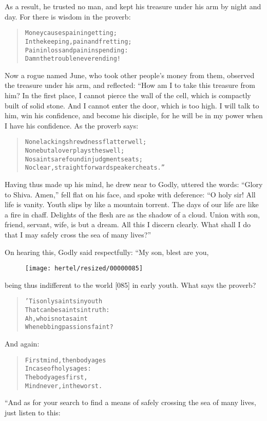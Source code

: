 \documentclass[article, twoside, 10pt]{memoir}
\renewenvironment{verbatim}{%
\begin{quote}%
\vskip -10pt%
\begin{alltt}\normalfont\small}{\end{alltt}%
\end{quote}%
\vskip -10pt
} %
\begin{document}
As a result, he trusted no man, and kept his treasure under his arm
by night and day. For there is wisdom in the proverb:

\begin{verbatim}
Money causes pain in getting;
In the keeping, pain and fretting;
Pain in loss and pain in spending:
Damn the trouble never ending!
\end{verbatim}
Now a rogue named June, who took other people's money from them,
observed the treasure under his arm, and reflected: “How am I to
take this treasure from him? In the first place, I cannot pierce
the wall of the cell, which is compactly built of solid stone. And
I cannot enter the door, which is too high. I will talk to him, win
his confidence, and become his disciple, for he will be in my power
when I have his confidence. As the proverb says:

\begin{verbatim}
None lacking shrewdness flatter well;
None but a lover plays the swell;
No saints are found in judgment seats;
No clear, straightforward speaker cheats.”
\end{verbatim}
Having thus made up his mind, he drew near to Godly, uttered the
words: ``Glory to Shiva. Amen,'' fell flat on his face, and spoke
with deference:
``O holy sir! All life is vanity. Youth slips by like a mountain torrent. The days of our life are like a fire in chaff. Delights of the flesh are as the shadow of a cloud. Union with son, friend, servant, wife, is but a dream. All this I discern clearly. What shall I do that I may safely cross the sea of many lives?''

On hearing this, Godly said respectfully: “My son, blest are you,
\begin{figure}[p]\texttt{[image: hertel/resized/00000085]}\end{figure}being thus indifferent to the world [085] in early youth. What says
the proverb?

\begin{verbatim}
'Tis only saints in youth
That can be saints in truth:
Ah, who is not a saint
When ebbing passions faint?
\end{verbatim}
And again:

\begin{verbatim}
First mind, then body ages
In case of holy sages:
The body ages first,
Mind never, in the worst.
\end{verbatim}
“And as for your search to find a means of safely crossing the sea
of many lives, just listen to this:
\end{document}
